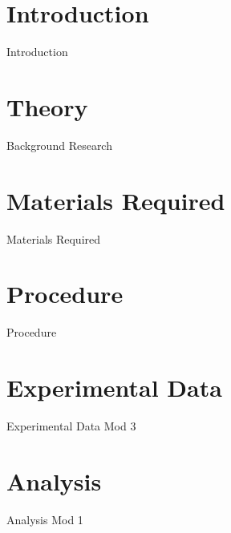 \documentclass[12pt, a4paper]{report}
\begin{document}
\maketitle

\tableofcontents
\clearpage






\chapter{{Introduction}}
        
        {Introduction}  
        
\chapter{{Theory}}
        
        {Background Research}
        
\chapter{{Materials Required}}
        
        {Materials Required}
        
\chapter{{Procedure}}
        
        {Procedure}
        
\chapter{{Experimental Data}}
        
		{Experimental Data Mod 3}
        
\chapter{{Analysis}}

		{Analysis Mod 1}

        
\end{document}
